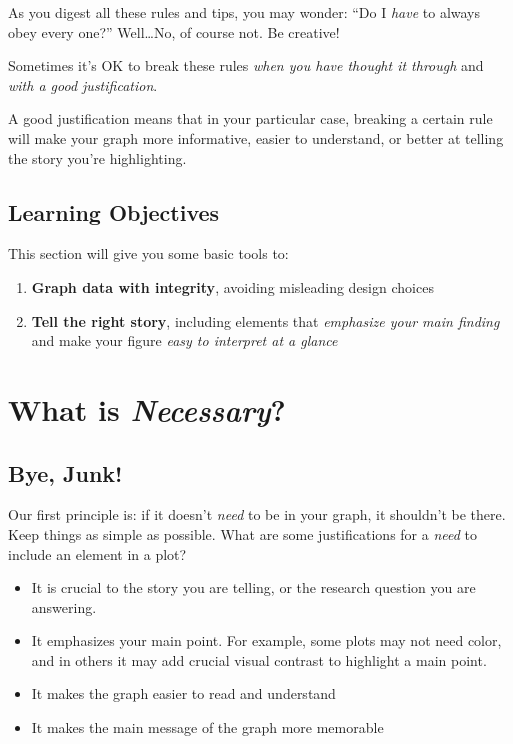 \documentclass[
  letterpaper,
  DIV=11,
  numbers=noendperiod]{scrreprt}
\providecommand{\tightlist}{%
  \setlength{\itemsep}{0pt}\setlength{\parskip}{0pt}}\usepackage{longtable,booktabs,array}
\theoremstyle{remark}
\begin{document}
As you digest all these rules and tips, you may wonder: ``Do I
\emph{have} to always obey every one?'' Well\ldots No, of course not. Be
creative!

Sometimes it's OK to break these rules \emph{when you have thought it
through} and \emph{with a good justification}.

A good justification means that in your particular case, breaking a
certain rule will make your graph more informative, easier to
understand, or better at telling the story you're highlighting.

\section*{Learning Objectives}\label{learning-objectives}


This section will give you some basic tools to:

\begin{enumerate}
\def\labelenumi{\arabic{enumi}.}
\tightlist
\item
  \textbf{Graph data with integrity}, avoiding misleading design choices
\item
  \textbf{Tell the right story}, including elements that \emph{emphasize
  your main finding} and make your figure \emph{easy to interpret at a
  glance}
\end{enumerate}

\chapter{\texorpdfstring{What is
\emph{Necessary}?}{What is Necessary?}}\label{what-is-necessary}

\section{Bye, Junk!}\label{bye-junk}

Our first principle is: if it doesn't \emph{need} to be in your graph,
it shouldn't be there. Keep things as simple as possible. What are some
justifications for a \emph{need} to include an element in a plot?

\begin{itemize}
\tightlist
\item
  It is crucial to the story you are telling, or the research question
  you are answering.
\item
  It emphasizes your main point. For example, some plots may not need
  color, and in others it may add crucial visual contrast to highlight a
  main point.
\item
  It makes the graph easier to read and understand
\item
  It makes the main message of the graph more memorable
\end{itemize}
\end{document}
